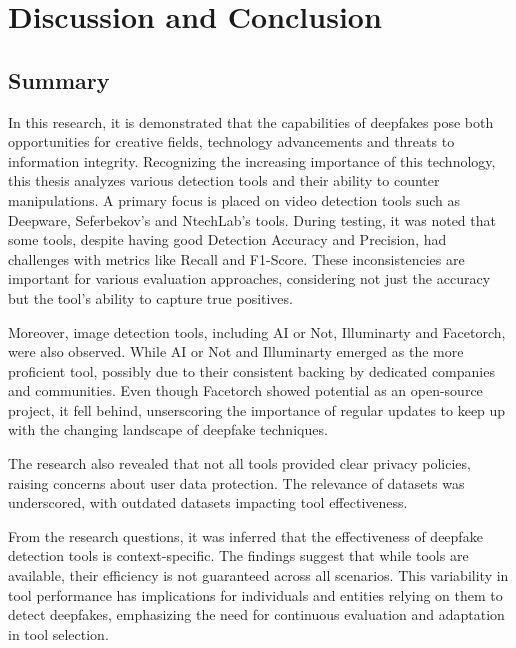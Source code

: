 
\chapter{Discussion and Conclusion}\label{chapter:conclusion}
\section{Summary}
In this research, it is demonstrated that the capabilities of deepfakes pose both
opportunities for creative fields, technology advancements and threats to information
integrity. Recognizing the increasing importance of this technology, this thesis analyzes
various detection tools and their ability to counter manipulations. A primary focus is placed
on video detection tools such as Deepware, Seferbekov's and NtechLab's tools. During testing,
it was noted that some tools, despite having good Detection Accuracy and Precision,
had challenges with metrics like Recall and F1-Score. These inconsistencies are
important for various evaluation approaches, considering not just the accuracy but the tool's 
ability to capture true positives.

Moreover, image detection tools, including AI or Not, Illuminarty and Facetorch, were
also observed. While AI or Not and Illuminarty emerged as the more proficient tool,
possibly due to their consistent backing by dedicated companies and communities.
Even though Facetorch showed potential as an open-source project, it fell behind,
unserscoring the importance of regular updates to keep up with the changing landscape
of deepfake techniques.

The research also revealed that not all tools provided clear privacy policies, raising
concerns about user data protection. The relevance of datasets was underscored, with
outdated datasets impacting tool effectiveness.

From the research questions, it was inferred that the effectiveness of deepfake detection
tools is context-specific. The findings suggest that while tools are available, their
efficiency is not guaranteed across all scenarios. This variability in tool performance
has implications for individuals and entities relying on them to detect deepfakes,
emphasizing the need for continuous evaluation and adaptation in tool selection.

